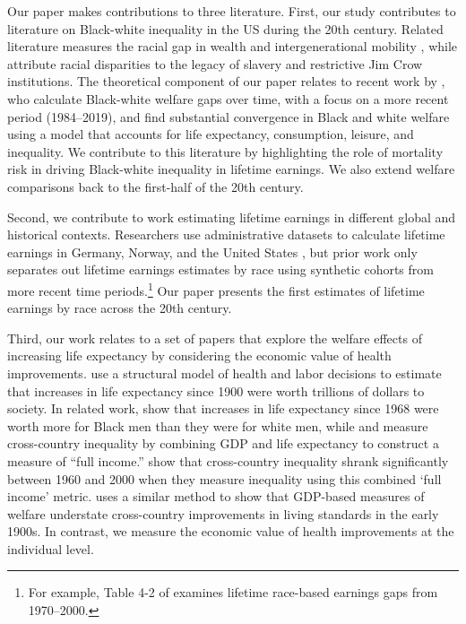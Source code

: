 \documentclass[12pt]{article}
\begin{document}

Our paper makes contributions to three literature. 
First, our study contributes to literature on Black-white inequality in the US during the 20th century. 
Related literature measures the racial gap in wealth  and intergenerational mobility , while  attribute racial disparities to the legacy of slavery and restrictive Jim Crow institutions. 
The theoretical component of our paper relates to recent work by , who calculate Black-white welfare gaps over time, with a focus on a more recent period (1984--2019), and find substantial convergence in Black and white welfare using a model that accounts for life expectancy, consumption, leisure, and inequality. 
We contribute to this literature by highlighting the role of mortality risk in driving Black-white inequality in lifetime earnings. 
We also extend welfare comparisons back to the first-half of the 20th century. 

Second, we contribute to work estimating lifetime earnings in different global and historical contexts. 
Researchers use administrative datasets to calculate lifetime earnings in Germany, Norway, and the United States , but prior work only separates out lifetime earnings estimates by race using synthetic cohorts from more recent time periods.\footnote{For example, Table 4-2 of  examines lifetime race-based earnings gaps from 1970--2000.} 
Our paper presents the first estimates of lifetime earnings by race across the 20th century. 

Third, our work relates to a set of papers that explore the welfare effects of increasing life expectancy by considering the economic value of health improvements. 
 use a structural model of health and labor decisions to estimate that increases in life expectancy since 1900 were worth trillions of dollars to society. 
In related work,  show that increases in life expectancy since 1968 were worth more for Black men than they were for white men, while  and  measure cross-country inequality by combining GDP and life expectancy to construct a measure of ``full income.'' 
 show that cross-country inequality shrank significantly between 1960 and 2000 when they measure inequality using this combined `full income' metric. 
 uses a similar method to show that GDP-based measures of welfare understate cross-country improvements in living standards in the early 1900s.
In contrast, we measure the economic value of health improvements at the individual level. 
\end{document}
